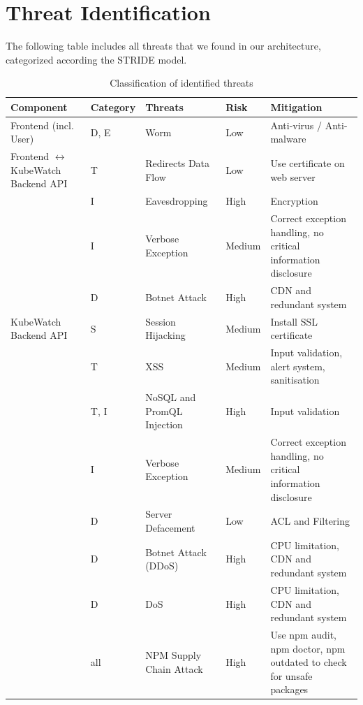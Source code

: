 \newpage
\section{Threat Identification}
The following table includes all threats that we found in our architecture, categorized according the STRIDE model.
\begin{longtable}[h!]{p{2.1cm} | p{1.8cm} | p{3cm} | p{2cm} | p{3.5cm}}
    \textbf{Component} & \textbf{Category} & \textbf{Threats} & \textbf{Risk} & \textbf{Mitigation} \\ \hline
    \endhead
    \caption{\label{tab:threats-classification}Classification of identified threats}
    \endlastfoot
    Frontend (incl. User)              
                        & D, E & Worm & Low & Anti-virus / Anti-malware\\
    \hline
    Frontend  \(\leftrightarrow\) KubeWatch Backend API
                        & T & Redirects Data Flow & Low & Use certificate on web server \\
                        & I & Eavesdropping & High & Encryption \\
                        & I & Verbose Exception & Medium & Correct exception handling, no critical information disclosure \\
                        & D & Botnet Attack & High & CDN and redundant system \\
    \hline
    KubeWatch Backend API
                        & S & Session Hijacking & Medium & Install SSL certificate \\
                        & T & XSS & Medium & Input validation, alert system, sanitisation \\
                        & T, I & NoSQL and PromQL Injection & High & Input validation \\
                        & I & Verbose Exception & Medium & Correct exception handling, no critical information disclosure \\
                        & D & Server Defacement & Low & ACL and Filtering \\
                        & D & Botnet Attack (DDoS) & High & CPU limitation, CDN and redundant system \\
                        & D & DoS & High & CPU limitation, CDN and redundant system \\
                        &all& NPM Supply Chain Attack & High & Use npm audit, npm doctor, npm outdated to check for unsafe packages \\

\end{longtable}
